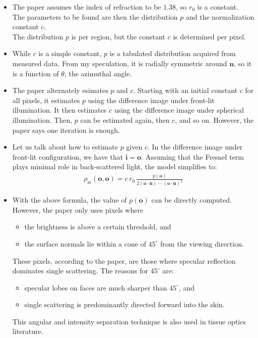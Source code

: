 \documentclass[10pt]{article}
\newcommand{\ve}[1]{\mathbf{#1}}
\begin{document}
\begin{itemize}
		 \item The paper assumes the index of refraction to be $1.38$, so $r_0$ is a constant.\\
		 The parameters to be found are then the distribution $p$ and the normalization constant $c$.\\
		 The distribution $p$ is per region, but the constant $c$ is determined per pixel.

		 \item While $c$ is a simple constant, $p$ is a tabulated distribution acquired from measured data.  From my speculation, it is radially symmetric around $\ve{n}$, so it is a function of $\theta$, the azimuthal angle.

		\item The paper alternately esimates $p$ and $c$.  Starting with an initial constant $c$ for all pixels, it estimates $p$ using the difference image under front-lit illumination.  It then estimates $c$ using the difference image under spherical illumination.  Then, $p$ can be estimated again, then $c$, and so on.  However, the paper says one iteration is enough.

  		\item Let us talk about how to estimate $p$ given $c$.  In the difference image under front-lit configuration,  we have that $\ve{i} = \ve{o}$.  Assuming that the Fresnel term plays minimal role in back-scattered light, the model simplifies to:
  		\begin{align*}
  			\rho_{\mathrm{sr}}(\ve{o},\ve{o}) = c \, r_0 \, \frac{p(\ve{o})}{2(\ve{o} \cdot \ve{n}) - (\ve{o} \cdot \ve{n})^2}
  		\end{align*}

  		\item With the above formula, the value of $p(\ve{o})$ can be directly computed.  However, the paper only uses pixels where
  		\begin{itemize}
  			\item the brightness is above a certain threshold, and
  			\item the surface normals lie within a cone of $45^\circ$ from the viewing direction.
  		\end{itemize}
  		These pixels, according to the paper, are those where specular reflection dominates single scattering.  The reasons for $45^\circ$ are:
  		\begin{itemize}
  			\item specular lobes on faces are much sharper than $45^\circ$, and
  			\item single scattering is predominantly directed forward into the skin.
  		\end{itemize} 
  		This angular and intensity separation technique is also used in tissue optics literature.  


\end{itemize}
\end{document}
